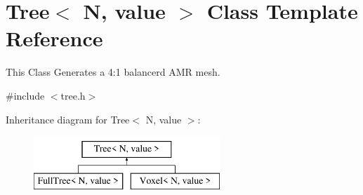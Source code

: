 \hypertarget{classTree}{}\section{Tree$<$ N, value $>$ Class Template Reference}
\label{classTree}


This Class Generates a 4\+:1 balancerd A\+MR mesh.  




{\ttfamily \#include $<$tree.\+h$>$}

Inheritance diagram for Tree$<$ N, value $>$\+:\begin{figure}[H]
\begin{center}
\leavevmode
\includegraphics[height=2.000000cm]{classTree}
\end{center}
\end{figure}
